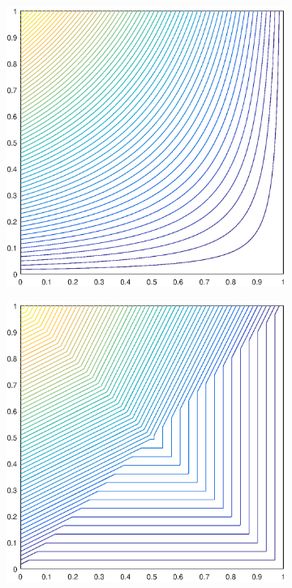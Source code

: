 \documentclass[11pt]{article}
\begin{document}
\begin{figure}
\centering
	\begin{subfigure}[b]{0.225\textwidth}
		\centering
		\includegraphics[width=\textwidth]{figures/square_WACHSPRESS1_contour_b4.eps}
		\caption{}
	\end{subfigure}
	\hspace{1cm}
	\begin{subfigure}[b]{0.225\textwidth}
		\centering
		\includegraphics[width=\textwidth]{figures/square_PWLD1_contour_b4.eps}

\end{subfigure}
\end{figure}
\end{document}
